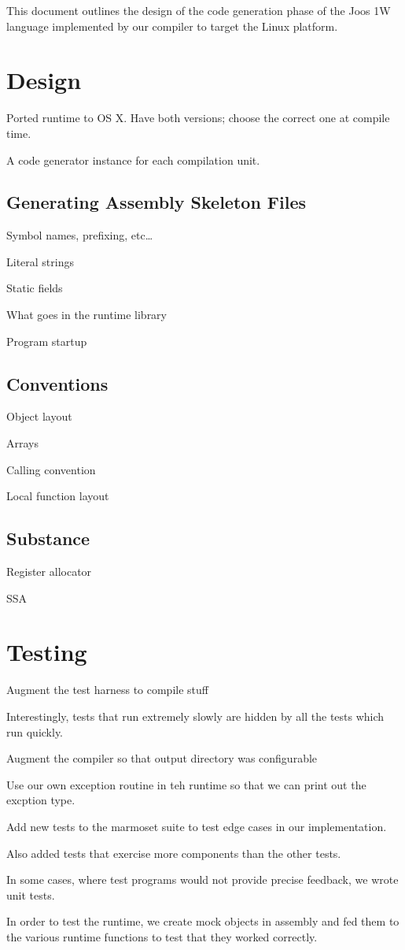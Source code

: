 \documentclass[pdftex,11pt,a4paper]{article}
\begin{document}

This document outlines the design of the code generation phase of
the Joos 1W language implemented by our compiler to target the
 Linux platform.


\section{Design}

Ported runtime to OS X. Have both versions; choose the correct one at
compile time.

A code generator instance for each compilation unit.

\subsection{Generating Assembly Skeleton Files}

Symbol names, prefixing, etc\ldots

Literal strings

Static fields

What goes in the runtime library

Program startup


\subsection{Conventions}

Object layout

Arrays

Calling convention

Local function layout


\subsection{Substance}

Register allocator

SSA


\section{Testing}

Augment the test harness to compile stuff

Interestingly, tests that run extremely slowly are hidden by all the
tests which run quickly.

Augment the compiler so that output directory was configurable

Use our own exception routine in teh runtime so that we can print out
the excption type.

Add new tests to the marmoset suite to test edge cases in our
implementation.

Also added tests that exercise more components than the other tests.

In some cases, where test programs would not provide precise feedback,
we wrote unit tests.

In order to test the runtime, we create mock objects in assembly and
fed them to the various runtime functions to test that they worked
correctly.
\end{document}
